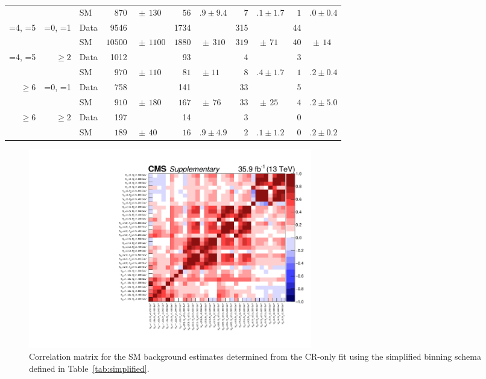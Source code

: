 \begin{table}[!t]
\begin{tabular}{rrlr@{}lr@{}lr@{}lr@{}l}
                   &           & SM   & $870$      & $\,\pm\, 130$     & $56$      & $.9 \pm 9.4$   & $7$   & $.1 \pm 1.7$  & $1$   & $.0 \pm 0.4$ \\[0.2ex]
    =4, =5         & =0, =1    & Data & 9546       &                   & 1734      &                & 315   &               & 44                   \\
                   &           & SM   & $10500$    & $\,\pm\, 1100$    & $1880$    & $\,\pm\, 310$  & $319$ & $\,\pm\, 71$  & $40$  & $\,\pm\, 14$ \\[0.2ex]
    =4, =5         & ${\geq}2$ & Data & 1012       &                   & 93        &                & 4     &               & 3                    \\
                   &           & SM   & $970$      & $\,\pm\, 110$     & $81$      & $\, \pm 11$    & $8$   & $.4 \pm 1.7$  & $1$   & $.2 \pm 0.4$ \\[0.2ex]
    ${\geq}6$      & =0, =1    & Data & 758        &                   & 141       &                & 33    &               & 5                    \\
                   &           & SM   & $910$      & $\,\pm\, 180$     & $167$     & $\,\pm\, 76$   & $33$  & $\,\pm\, 25$  & $4$   & $.2 \pm 5.0$ \\[0.2ex]
    ${\geq}6$      & ${\geq}2$ & Data & 197        &                   & 14        &                & 3     &               & 0                    \\
                   &           & SM   & $189$      & $\,\pm\, 40$      & $16$      & $.9 \pm 4.9$   & $2$   & $.1 \pm 1.2$  & $0$   & $.2 \pm 0.2$ \\
    \hline
  \end{tabular}
\end{table}
\endgroup

\begin{figure}[!b]
  \centering
  \includegraphics[width=0.6\textwidth]{Figures/correlation.pdf}
  \caption{Correlation matrix for the SM background estimates
    determined from the CR-only fit using the simplified binning
    schema defined in Table~\ref{tab:simplified}.}
  \label{fig:correlation}
\end{figure} 
